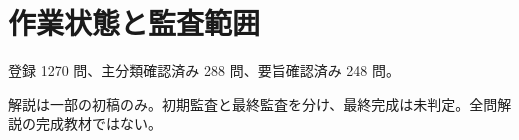 \chapter{作業状態と監査範囲}
登録 1270 問、主分類確認済み 288 問、要旨確認済み 248 問。
\par 解説は一部の初稿のみ。初期監査と最終監査を分け、最終完成は未判定。全問解説の完成教材ではない。
